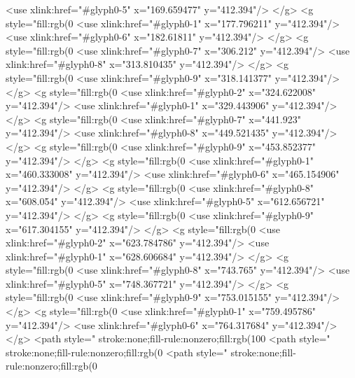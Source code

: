   <use xlink:href="#glyph0-5" x="169.659477" y="412.394"/>
</g>
<g style="fill:rgb(0%
  <use xlink:href="#glyph0-1" x="177.796211" y="412.394"/>
  <use xlink:href="#glyph0-6" x="182.61811" y="412.394"/>
</g>
<g style="fill:rgb(0%
  <use xlink:href="#glyph0-7" x="306.212" y="412.394"/>
  <use xlink:href="#glyph0-8" x="313.810435" y="412.394"/>
</g>
<g style="fill:rgb(0%
  <use xlink:href="#glyph0-9" x="318.141377" y="412.394"/>
</g>
<g style="fill:rgb(0%
  <use xlink:href="#glyph0-2" x="324.622008" y="412.394"/>
  <use xlink:href="#glyph0-1" x="329.443906" y="412.394"/>
</g>
<g style="fill:rgb(0%
  <use xlink:href="#glyph0-7" x="441.923" y="412.394"/>
  <use xlink:href="#glyph0-8" x="449.521435" y="412.394"/>
</g>
<g style="fill:rgb(0%
  <use xlink:href="#glyph0-9" x="453.852377" y="412.394"/>
</g>
<g style="fill:rgb(0%
  <use xlink:href="#glyph0-1" x="460.333008" y="412.394"/>
  <use xlink:href="#glyph0-6" x="465.154906" y="412.394"/>
</g>
<g style="fill:rgb(0%
  <use xlink:href="#glyph0-8" x="608.054" y="412.394"/>
  <use xlink:href="#glyph0-5" x="612.656721" y="412.394"/>
</g>
<g style="fill:rgb(0%
  <use xlink:href="#glyph0-9" x="617.304155" y="412.394"/>
</g>
<g style="fill:rgb(0%
  <use xlink:href="#glyph0-2" x="623.784786" y="412.394"/>
  <use xlink:href="#glyph0-1" x="628.606684" y="412.394"/>
</g>
<g style="fill:rgb(0%
  <use xlink:href="#glyph0-8" x="743.765" y="412.394"/>
  <use xlink:href="#glyph0-5" x="748.367721" y="412.394"/>
</g>
<g style="fill:rgb(0%
  <use xlink:href="#glyph0-9" x="753.015155" y="412.394"/>
</g>
<g style="fill:rgb(0%
  <use xlink:href="#glyph0-1" x="759.495786" y="412.394"/>
  <use xlink:href="#glyph0-6" x="764.317684" y="412.394"/>
</g>
<path style=" stroke:none;fill-rule:nonzero;fill:rgb(100%
<path style=" stroke:none;fill-rule:nonzero;fill:rgb(0%
<path style=" stroke:none;fill-rule:nonzero;fill:rgb(0%
